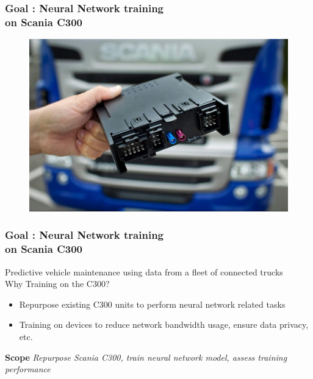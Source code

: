 \documentclass{beamer}
\begin{document}
\begin{frame}
  \frametitle{Goal : Neural Network training \\ on Scania C300}

  \begin{figure}
    \centering
    \includegraphics[scale=0.21]{../Body/images/c300.jpeg}
  \end{figure}

\end{frame}

\begin{frame}
  \frametitle{Goal : Neural Network training \\ on Scania C300}

    Predictive vehicle maintenance using data from a fleet of connected trucks \\

    Why Training on the C300?
    \begin{itemize}
        \item Repurpose existing C300 units to perform neural network related tasks
        \item Training on devices to reduce network bandwidth usage, ensure data privacy, etc.
    \end{itemize}

    \vskip 1cm
    \textbf{Scope} \textit{Repurpose Scania C300, train neural network model, assess training performance}

\end{frame}
\end{document}

